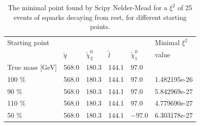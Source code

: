 \documentclass[twoside,english]{uiofysmaster}
\begin{document}
\begin{table}[hbt]
	\centering
	\begin{tabular}{| l | l | l | l | l | l |}
		\hline
		Starting point  &&&&																					&  Minimal $\xi^2$ \\ 
		 						& $\tilde q$	& $\tilde \chi_2^0$	& $\tilde l$	& $\tilde \chi_1^0$ & value \\ \hline
		True mass [GeV]			& 568.0         & 180.3 			& 144.1			& 97.0				& \\ \hline
		100 \% 					& 568.0   		& 180.3   			& 144.1   		& 97.0      		& 1.482195e-26 \\ \hline
		90 \%  					& 568.0   		& 180.3   			& 144.1   		& 97.0      		& 5.842969e-27 \\ \hline
		110 \% 					& 568.0   		& 180.3   			& 144.1   		& 97.0      		& 4.779690e-27 \\ \hline
		50 \%  					& 568.0   		& 180.3   			& 144.1   		& $-97.0$     		& 6.303178e-27 \\ \hline
	\end{tabular}
	\caption{The minimal point found by Scipy Nelder-Mead for a $\xi^2$ of 25 events of squarks decaying from rest, for different starting points.}
	\label{table:starting_point_fit_dependency_25events_simplistic}
\end{table}
\end{document}
